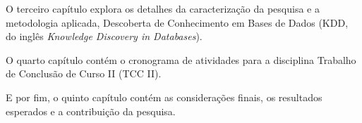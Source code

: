 O terceiro capítulo explora os detalhes da caracterização da pesquisa e a
metodologia aplicada, Descoberta de Conhecimento em Bases de Dados (KDD, do
inglês \textit{Knowledge Discovery in Databases}).

O quarto capítulo contém o cronograma de atividades para a disciplina Trabalho
de Conclusão de Curso II (TCC II).

E por fim, o quinto capítulo contém as considerações finais, os resultados
esperados e a contribuição da pesquisa.
